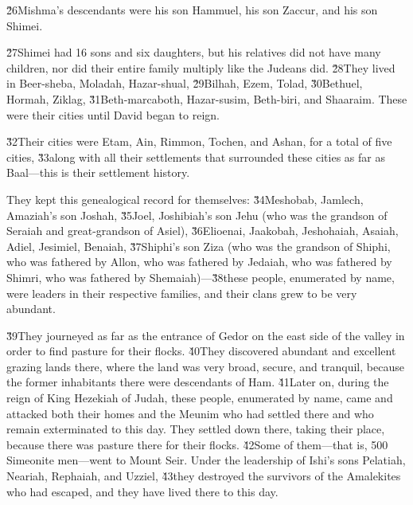 \v{26}Mishma's descendants were his son Hammuel, his son Zaccur, and his son Shimei.

\v{27}Shimei had 16 sons and six daughters, but his relatives did not have many children, nor did their entire family multiply like the Judeans did. \v{28}They lived in Beer-sheba, Moladah, Hazar-shual, \v{29}Bilhah, Ezem, Tolad, \v{30}Bethuel, Hormah, Ziklag, \v{31}Beth-marcaboth, Hazar-susim, Beth-biri, and Shaaraim. These were their cities until David began to reign.

\v{32}Their cities were Etam, Ain, Rimmon, Tochen, and Ashan, for a total of five cities, \v{33}along with all their settlements that surrounded these cities as far as Baal---this is their settlement history.

They kept this genealogical record for themselves: \v{34}Meshobab, Jamlech, Amaziah's son Joshah, \v{35}Joel, Joshibiah's son Jehu (who was the grandson of Seraiah and great-grandson of Asiel), \v{36}Elioenai, Jaakobah, Jeshohaiah, Asaiah, Adiel, Jesimiel, Benaiah, \v{37}Shiphi's son Ziza (who was the grandson of Shiphi, who was fathered by Allon, who was fathered by Jedaiah, who was fathered by Shimri, who was fathered by Shemaiah)---\v{38}these people, enumerated by name, were leaders in their respective families, and their clans grew to be very abundant.

\v{39}They journeyed as far as the entrance of Gedor on the east side of the valley in order to find pasture for their flocks. \v{40}They discovered abundant and excellent grazing lands there, where the land was very broad, secure, and tranquil, because the former inhabitants there were descendants of Ham. \v{41}Later on, during the reign of King Hezekiah of Judah, these people, enumerated by name, came and attacked both their homes and the Meunim who had settled there and who remain exterminated to this day. They settled down there, taking their place, because there was pasture there for their flocks. \v{42}Some of them---that is, 500 Simeonite men---went to Mount Seir. Under the leadership of Ishi's sons Pelatiah, Neariah, Rephaiah, and Uzziel, \v{43}they destroyed the survivors of the Amalekites who had escaped, and they have lived there to this day.


